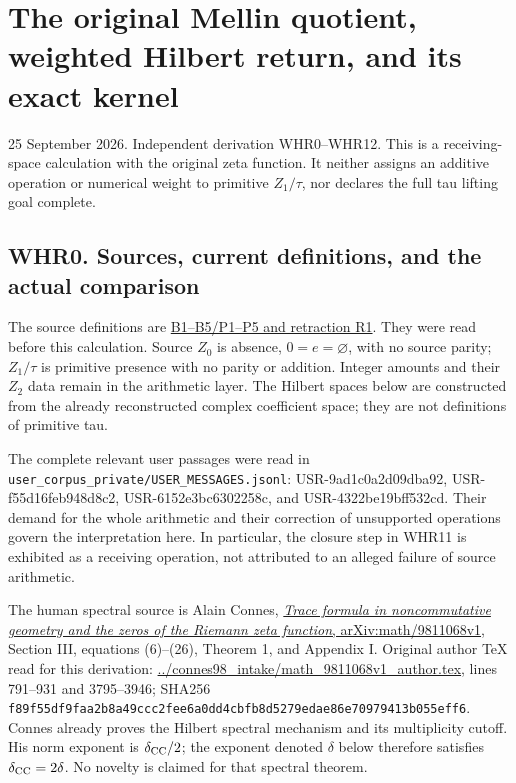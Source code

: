 \section{The original Mellin quotient, weighted Hilbert return, and its
exact
kernel}\label{the-original-mellin-quotient-weighted-hilbert-return-and-its-exact-kernel}

25 September 2026. Independent derivation WHR0--WHR12. This is a
receiving-space calculation with the original zeta function. It neither
assigns an additive operation or numerical weight to primitive
\(Z_1/\tau\), nor declares the full tau lifting goal complete.

\subsection{WHR0. Sources, current definitions, and the actual
comparison}\label{whr0.-sources-current-definitions-and-the-actual-comparison}

The source definitions are
\href{https://github.com/KokunoYumeto/zeta-function-research-reader/blob/36a82ecca98addb8a98b48204e349737856c7223/workbenches/splitzero-tandem/continuations/20260924-cohomology-weight-and-character-lifts/original-character-lifting/foundations/user_definitions_20260924/SOURCE_OPERATIONS_AND_PROOFS.md}{B1--B5/P1--P5
and retraction R1}. They were read before this calculation. Source
\(Z_0\) is absence, \(0=e=\varnothing\), with no source parity;
\(Z_1/\tau\) is primitive presence with no parity or addition. Integer
amounts and their \(Z_2\) data remain in the arithmetic layer. The
Hilbert spaces below are constructed from the already reconstructed
complex coefficient space; they are not definitions of primitive tau.

The complete relevant user passages were read in
\texttt{user\_corpus\_private/USER\_MESSAGES.jsonl}:
USR-9ad1c0a2d09dba92, USR-f55d16feb948d8c2, USR-6152e3bc6302258c, and
USR-4322be19bff532cd. Their demand for the whole arithmetic and their
correction of unsupported operations govern the interpretation here. In
particular, the closure step in WHR11 is exhibited as a receiving
operation, not attributed to an alleged failure of source arithmetic.

The human spectral source is Alain Connes,
\href{https://arxiv.org/abs/math/9811068v1}{\emph{Trace formula in
noncommutative geometry and the zeros of the Riemann zeta function},
arXiv:math/9811068v1}, Section III, equations (6)--(26), Theorem 1, and
Appendix I. Original author TeX read for this derivation:
\href{https://arxiv.org/abs/math/9811068v1}{../connes98\_intake/math\_9811068v1\_author.tex},
lines 791--931 and 3795--3946; SHA256
\texttt{f89f55df9faa2b8a49ccc2fee6a0dd4cbfb8d5279edae86e70979413b055eff6}.
Connes already proves the Hilbert spectral mechanism and its
multiplicity cutoff. His norm exponent is \(\delta_{\rm CC}/2\); the
exponent denoted \(\delta\) below therefore satisfies
\(\delta_{\rm CC}=2\delta\). No novelty is claimed for that spectral
theorem.

